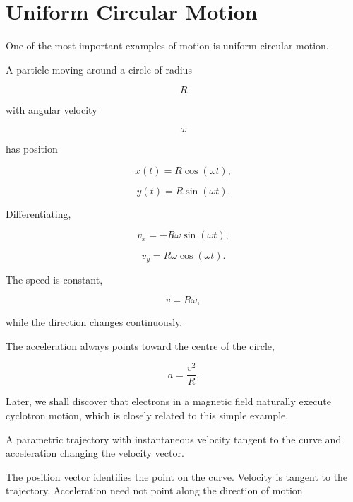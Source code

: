 \section{Uniform Circular Motion}

One of the most important examples of motion is uniform circular motion.

A particle moving around a circle of radius

\[
R
\]

with angular velocity

\[
\omega
\]

has position

\[
x(t)=R\cos(\omega t),
\]

\[
y(t)=R\sin(\omega t).
\]

Differentiating,

\[
v_x
=
-R\omega\sin(\omega t),
\]

\[
v_y
=
R\omega\cos(\omega t).
\]

The speed is constant,

\[
v
=
R\omega,
\]

while the direction changes continuously.

The acceleration always points toward the centre of the circle,

\[
\boxed{
	a
	=
	\frac{v^2}{R}.
}
\]

Later, we shall discover that electrons in a magnetic field naturally execute
cyclotron motion, which is closely related to this simple example.



\begin{bookfigure}{A parametric trajectory with instantaneous velocity tangent
to the curve and acceleration changing the velocity vector.}
\end{bookfigure}

\begin{visualguidebox}
The position vector identifies the point on the curve. Velocity is tangent to
the trajectory. Acceleration need not point along the direction of motion.
\end{visualguidebox}

